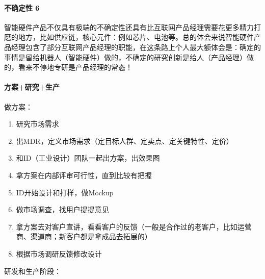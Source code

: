\documentclass[letterpaper,10pt,english]{sphinxmanual}
\begin{document}
\paragraph{不确定性 6\sphinxfootnotemark[787]}
\label{\detokenize{chapter_project/AI_hardware:id1}}%
\begin{footnotetext}[787]\sphinxAtStartFootnote
{}
%
\end{footnotetext}\ignorespaces 
智能硬件产品不仅具有极端的不确定性还具有比互联网产品经理需要花更多精力打磨的地方，比如供应链，核心元件：例如芯片、电池等。总的体会来说智能硬件产品经理包含了部分互联网产品经理的职能，在这条路上个人最大额体会是：确定的事情是留给机器人（智能硬件）做的，不确定的研究创新是给人（产品经理）做的，看来不停地专研是产品经理的常态！


\paragraph{方案+研究+生产}
\label{\detokenize{chapter_project/AI_hardware:id2}}
做方案：
\begin{enumerate}
%
\item {} 
研究市场需求

\item {} 
出MDR，定义市场需求（定目标人群、定卖点、定关键特性、定价）

\item {} 
和ID（工业设计）团队一起出方案，出效果图

\item {} 
拿方案在内部评审可行性，直到比较有把握

\item {} 
ID开始设计和打样，做Mockup

\item {} 
做市场调查，找用户提提意见

\item {} 
拿方案去对客户宣讲，看看客户的反馈（一般是合作过的老客户，比如运营商、渠道商；新客户都是拿成品去拓展的）

\item {} 
根据市场调研反馈修改设计

\end{enumerate}

研发和生产阶段：
\end{document}
